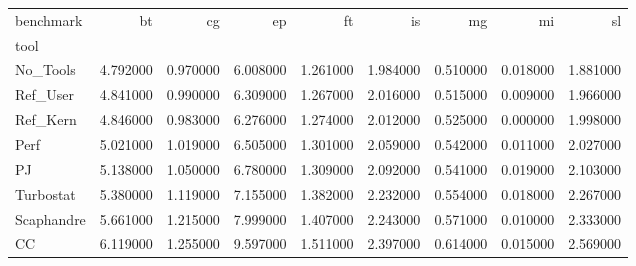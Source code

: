 \begin{tabular}{lrrrrrrrr}
\toprule
benchmark & bt & cg & ep & ft & is & mg & mi & sl \\
tool &  &  &  &  &  &  &  &  \\
\midrule
No_Tools & 4.792000 & 0.970000 & 6.008000 & 1.261000 & 1.984000 & 0.510000 & 0.018000 & 1.881000 \\
Ref_User & 4.841000 & 0.990000 & 6.309000 & 1.267000 & 2.016000 & 0.515000 & 0.009000 & 1.966000 \\
Ref_Kern & 4.846000 & 0.983000 & 6.276000 & 1.274000 & 2.012000 & 0.525000 & 0.000000 & 1.998000 \\
Perf & 5.021000 & 1.019000 & 6.505000 & 1.301000 & 2.059000 & 0.542000 & 0.011000 & 2.027000 \\
PJ & 5.138000 & 1.050000 & 6.780000 & 1.309000 & 2.092000 & 0.541000 & 0.019000 & 2.103000 \\
Turbostat & 5.380000 & 1.119000 & 7.155000 & 1.382000 & 2.232000 & 0.554000 & 0.018000 & 2.267000 \\
Scaphandre & 5.661000 & 1.215000 & 7.999000 & 1.407000 & 2.243000 & 0.571000 & 0.010000 & 2.333000 \\
CC & 6.119000 & 1.255000 & 9.597000 & 1.511000 & 2.397000 & 0.614000 & 0.015000 & 2.569000 \\
\bottomrule
\end{tabular}
